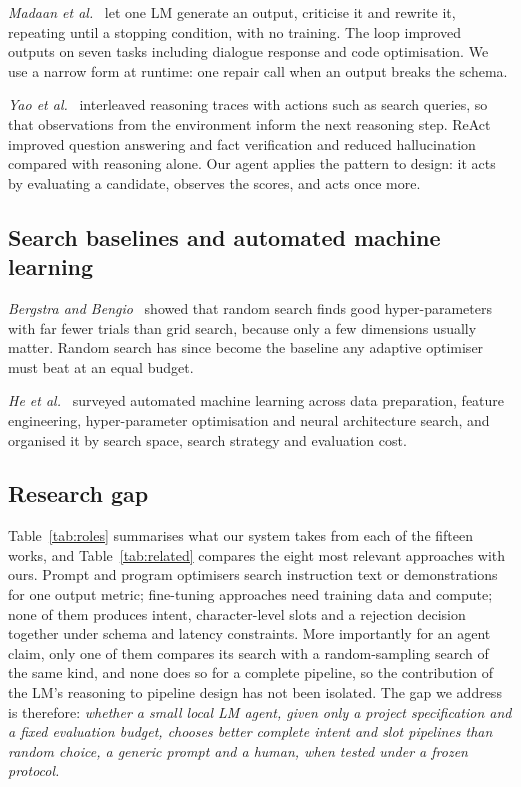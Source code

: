 \documentclass[conference]{IEEEtran}
\begin{document}
\emph{Madaan et al.}~\cite{madaan2023selfrefine} let one LM generate an output, criticise it and rewrite it, repeating until a stopping condition, with no training. The loop improved outputs on seven tasks including dialogue response and code optimisation. We use a narrow form at runtime: one repair call when an output breaks the schema.

\emph{Yao et al.}~\cite{yao2023react} interleaved reasoning traces with actions such as search queries, so that observations from the environment inform the next reasoning step. ReAct improved question answering and fact verification and reduced hallucination compared with reasoning alone. Our agent applies the pattern to design: it acts by evaluating a candidate, observes the scores, and acts once more.

\subsection{Search baselines and automated machine learning}

\emph{Bergstra and Bengio}~\cite{bergstra2012random} showed that random search finds good hyper-parameters with far fewer trials than grid search, because only a few dimensions usually matter. Random search has since become the baseline any adaptive optimiser must beat at an equal budget.

\emph{He et al.}~\cite{he2021automl} surveyed automated machine learning across data preparation, feature engineering, hyper-parameter optimisation and neural architecture search, and organised it by search space, search strategy and evaluation cost.
\subsection{Research gap}

Table~\ref{tab:roles} summarises what our system takes from each of the fifteen works, and Table~\ref{tab:related} compares the eight most relevant approaches with ours. Prompt and program optimisers search instruction text or demonstrations for one output metric; fine-tuning approaches need training data and compute; none of them produces intent, character-level slots and a rejection decision together under schema and latency constraints. More importantly for an agent claim, only one of them compares its search with a random-sampling search of the same kind, and none does so for a complete pipeline, so the contribution of the LM's reasoning to pipeline design has not been isolated. The gap we address is therefore: \emph{whether a small local LM agent, given only a project specification and a fixed evaluation budget, chooses better complete intent and slot pipelines than random choice, a generic prompt and a human, when tested under a frozen protocol.}
\end{document}
